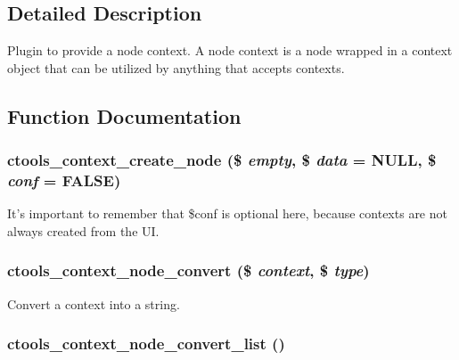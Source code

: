 \subsection{Detailed Description}
Plugin to provide a node context. A node context is a node wrapped in a context object that can be utilized by anything that accepts contexts. 

\subsection{Function Documentation}
\hypertarget{ctools_2plugins_2contexts_2node_8inc_ac198dbec6d4d3f84b4c3264b27e647ad}{
\subsubsection[{ctools\_\-context\_\-create\_\-node}]{\setlength{\rightskip}{0pt plus 5cm}ctools\_\-context\_\-create\_\-node (\$ {\em empty}, \/  \$ {\em data} = {\ttfamily NULL}, \/  \$ {\em conf} = {\ttfamily FALSE})}}
\label{ctools_2plugins_2contexts_2node_8inc_ac198dbec6d4d3f84b4c3264b27e647ad}
It's important to remember that \$conf is optional here, because contexts are not always created from the UI. \hypertarget{ctools_2plugins_2contexts_2node_8inc_a0ce0b7c1b8f5193407fa90f48c8d9fe6}{
\subsubsection[{ctools\_\-context\_\-node\_\-convert}]{\setlength{\rightskip}{0pt plus 5cm}ctools\_\-context\_\-node\_\-convert (\$ {\em context}, \/  \$ {\em type})}}
\label{ctools_2plugins_2contexts_2node_8inc_a0ce0b7c1b8f5193407fa90f48c8d9fe6}
Convert a context into a string. \hypertarget{ctools_2plugins_2contexts_2node_8inc_a0fcbefea62745d0bcc96ee8ab7b25086}{
\subsubsection[{ctools\_\-context\_\-node\_\-convert\_\-list}]{\setlength{\rightskip}{0pt plus 5cm}ctools\_\-context\_\-node\_\-convert\_\-list ()}}
